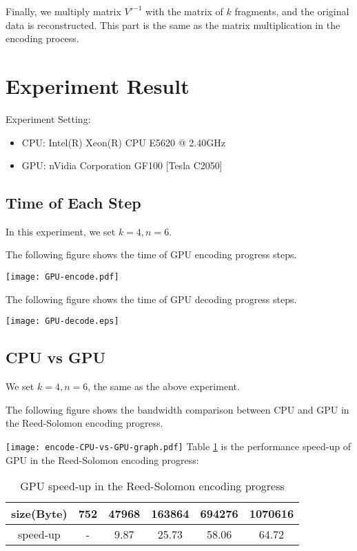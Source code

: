 \documentclass[a4paper]{article}
\begin{document}
Finally, we multiply matrix $V'^{-1}$ with the matrix of $k$ fragments,
and the original data is reconstructed. This part is the same as the matrix multiplication in the encoding process.

\section{Experiment Result}
Experiment Setting:
\begin{itemize}
  \item CPU: Intel(R) Xeon(R) CPU E5620  @ 2.40GHz
  \item GPU: nVidia Corporation GF100 [Tesla C2050]
\end{itemize}

\subsection{Time of Each Step}

In this experiment, we set $k=4, n=6$.

The following figure shows the time of GPU encoding progress steps.

\texttt{[image: GPU-encode.pdf]}

The following figure shows the time of GPU decoding progress steps.

\texttt{[image: GPU-decode.eps]}

\subsection{CPU vs GPU}

We set $k=4, n=6$, the same as the above experiment.

The following figure shows the bandwidth comparison between CPU and GPU in the Reed-Solomon encoding progress.

\texttt{[image: encode-CPU-vs-GPU-graph.pdf]}
Table \ref{encoding-speed-up} is the performance speed-up of GPU in the Reed-Solomon encoding progress:
\begin{table}
\caption{
GPU speed-up in the Reed-Solomon encoding progress
}
\begin{center}
\begin{tabular}{|c|c|c|c|c|c|}
\hline
size(Byte) &  752 & 47968 & 163864 & 694276 & 1070616 \\
\hline
speed-up   &  -   & 9.87  & 25.73  & 58.06  & 64.72 \\
\hline
\end{tabular}
\label{encoding-speed-up}
\end{center}
\end{table}
\end{document}
